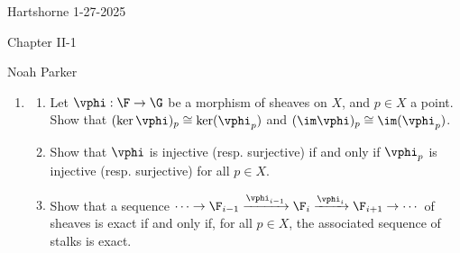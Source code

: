 \documentclass[12pt]{amsart}
\begin{document}
{Hartshorne} \hfill {1-27-2025}

\bigskip\bigskip

\begin{center}

{\sc Chapter II-1}

\end{center}

\begin{center}

  {Noah Parker} %
    
\end{center}

\bigskip

% 

\begin{enumerate}
	\item[1.2.] {
      \begin{enumerate}
        \item Let $\vphi:\F\to \G$ be a morphism of sheaves on $X$, and $p\in X$ a point.
          Show that $(\ker\vphi)_p\cong \ker(\vphi_p)$ and $(\im\vphi)_p\cong \im(\vphi_p)$.
        \item Show that $\vphi$ is injective (resp. surjective) if and only if $\vphi_p$ is injective (resp. surjective) for all $p\in X$.
        \item Show that a sequence $\cdots\to \F_{i-1}\xrightarrow{\vphi_{i-1}}\F_i\xrightarrow{\vphi_i}\F_{i+1}\to \cdots$ of sheaves is exact if and only if, for all $p\in X$, the associated sequence of stalks is exact.
      \end{enumerate}
    }
\end{enumerate}
\end{document}
